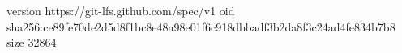 version https://git-lfs.github.com/spec/v1
oid sha256:ce89fe70de2d5d8f1bc8e48a98e01f6c918dbbadf3b2da8f3c24ad4fe834b7b8
size 32864
